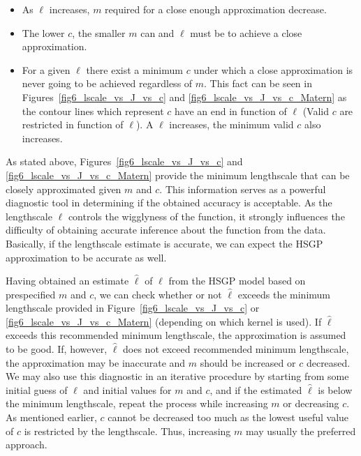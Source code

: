 \documentclass[onecolumn,a4paper,11pt]{article}
\begin{document}
\begin{itemize}
\item As $\ell$ increases, $m$ required for a close enough approximation decrease.
\item The lower $c$, the smaller $m$ can and $\ell$ must be to achieve a close approximation.
\item For a given $\ell$ there exist a minimum $c$ under which a close approximation is never going to be achieved regardless of $m$. This fact can be seen in Figures~\ref{fig6_lscale_vs_J_vs_c} and \ref{fig6_lscale_vs_J_vs_c_Matern} as the contour lines which represent $c$ have an end in function of $\ell$ (Valid $c$ are restricted in function of $\ell$). A $\ell$ increases, the minimum valid $c$ also increases.
\end{itemize}

As stated above, Figures~\ref{fig6_lscale_vs_J_vs_c} and \ref{fig6_lscale_vs_J_vs_c_Matern} provide the minimum lengthscale that can be closely approximated given $m$ and $c$. This information serves as a powerful diagnostic tool in determining if the obtained accuracy is acceptable. As the lengthscale $\ell$ controls the wigglyness of the function, it strongly influences the difficulty of obtaining accurate inference about the function from the data. Basically, if the lengthscale estimate is accurate, we can expect the HSGP approximation to be accurate as well.

Having obtained an estimate $\hat{\ell}$ of $\ell$ from the HSGP model based on prespecified $m$ and $c$, we can check whether or not $\hat{\ell}$ exceeds the minimum lengthscale provided in Figure~\ref{fig6_lscale_vs_J_vs_c} or \ref{fig6_lscale_vs_J_vs_c_Matern} (depending on which kernel is used). If $\hat{\ell}$ exceeds this recommended minimum lengthscale, the approximation is assumed to be good. If, however, $\hat{\ell}$ does not exceed recommended minimum lengthscale, the approximation may be inaccurate and $m$ should be increased or $c$ decreased. We may also use this diagnostic in an iterative procedure by starting from some initial guess of $\ell$ and initial values for $m$ and $c$, and if the estimated $\hat{\ell}$ is below the minimum lengthscale, repeat the process while increasing $m$ or decreasing $c$. As mentioned earlier, $c$ cannot be decreased too much as the lowest useful value of $c$ is restricted by the lengthscale. Thus, increasing $m$ may usually the preferred approach.
\end{document}
